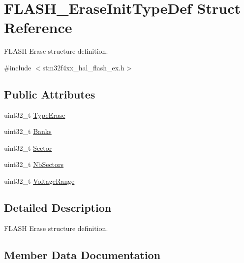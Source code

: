 \hypertarget{struct_f_l_a_s_h___erase_init_type_def}{}\section{F\+L\+A\+S\+H\+\_\+\+Erase\+Init\+Type\+Def Struct Reference}
\label{struct_f_l_a_s_h___erase_init_type_def}


F\+L\+A\+SH Erase structure definition.  




{\ttfamily \#include $<$stm32f4xx\+\_\+hal\+\_\+flash\+\_\+ex.\+h$>$}

\subsection*{Public Attributes}
\begin{DoxyCompactItemize}
\item 
uint32\+\_\+t \hyperlink{struct_f_l_a_s_h___erase_init_type_def_a5d08471046a663db76d2252848a7d66c}{Type\+Erase}
\item 
uint32\+\_\+t \hyperlink{struct_f_l_a_s_h___erase_init_type_def_a9590db921fb8d36daf38e097f68fc14f}{Banks}
\item 
uint32\+\_\+t \hyperlink{struct_f_l_a_s_h___erase_init_type_def_a13bac8f9a1ba504a265b44345ecf4d2b}{Sector}
\item 
uint32\+\_\+t \hyperlink{struct_f_l_a_s_h___erase_init_type_def_aec98fec1676cd618e3743158c855a76a}{Nb\+Sectors}
\item 
uint32\+\_\+t \hyperlink{struct_f_l_a_s_h___erase_init_type_def_a3a2a0c2c4ed573bb84c768c6dbb92cc9}{Voltage\+Range}
\end{DoxyCompactItemize}


\subsection{Detailed Description}
F\+L\+A\+SH Erase structure definition. 

\subsection{Member Data Documentation}
